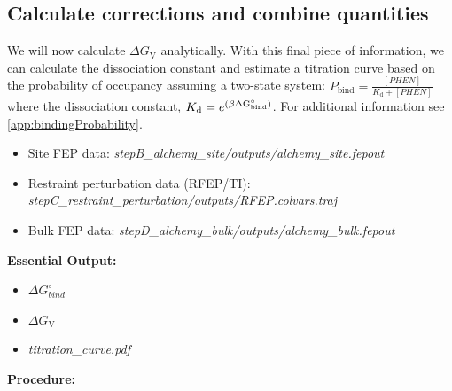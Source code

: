 \documentclass[9pt,tutorial]{Styling/livecoms}
\newcommand{\filepath}[1]{\textit{#1}}
\begin{document}
\subsection{Calculate corrections and combine quantities}
    \begin{tcolorbox}[colback=blue!5!white,colframe=blue!75!black]
    We will now calculate $\Delta G_\mathrm{V}$ analytically. With this final piece of information, we can calculate the dissociation constant and estimate a titration curve based on the probability of occupancy assuming a two-state system: $P_\mathrm{bind}=\frac{[PHEN]}{K_\mathrm{d}+[PHEN]}$ where the dissociation constant, ${K_\mathrm{d}}=e^{\left(\beta \Delta \rm{G^\circ_{bind}}\right)}$. For additional information see \ref{app:bindingProbability}.
    \end{tcolorbox}
    \begin{itemize}
        \item Site FEP data: \filepath{stepB\_alchemy\_site/outputs/alchemy\_site.fepout} 
        \item Restraint perturbation data (RFEP/TI): \filepath{stepC\_restraint\_perturbation/outputs/RFEP.colvars.traj}
        \item Bulk FEP data: \filepath{stepD\_alchemy\_bulk/outputs/alchemy\_bulk.fepout}
    \end{itemize}
    \textbf{Essential Output:}
    \begin{itemize}
        \item $\Delta G^\circ_{bind}$
        \item $\Delta G_\mathrm{V}$
        \item \filepath{titration\_curve.pdf}
    \end{itemize}
    \textbf{Procedure:}
\end{document}
